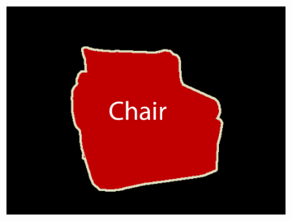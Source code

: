 \documentclass{article} %
\begin{document}
\begin{figure}[b]
\begin{subfigure}[b]{0.15\linewidth}
  \end{subfigure}
  \begin{subfigure}[b]{0.15\linewidth}
    \includegraphics[width=\textwidth]{figs/ab/gt/2008_004612}
  \end{subfigure}


\end{figure}
\end{document}
